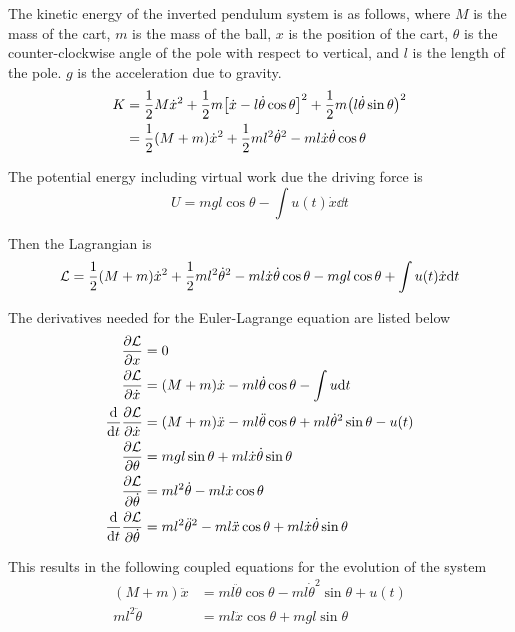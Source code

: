 \documentclass[a4paper,12pt]{article}
\begin{document}
The kinetic energy of the inverted pendulum system is as follows, where $M$ is
the mass of the cart, $m$ is the mass of the ball, $x$ is the position of the
cart, $\theta$ is the counter-clockwise angle of the pole with respect to
vertical, and $l$ is the length of the pole. $g$ is the acceleration due to
gravity.
\begin{align}
    K &= \frac{1}{2} M \dot{x}^2 \nonumber
      + \frac{1}{2} m \qty[ \dot{x} - l \dot{\theta} \cos \theta]^2
      + \frac{1}{2} m \qty(l \dot{\theta} \sin \theta)^2 \\
      &= \frac{1}{2} \qty(M+m) \dot{x}^2 + \frac{1}{2} m l^2 \dot{\theta}^2
      - ml \dot{x} \dot{\theta} \cos \theta
\end{align}

The potential energy including virtual work due the driving force is
\begin{equation}
    U = mgl \cos \theta - \int u(t) \dot{x} \dd t
\end{equation}

Then the Lagrangian is
\begin{equation}
    \mathcal{L}
        = \frac{1}{2} \qty(M+m) \dot{x}^2
        + \frac{1}{2} m l^2 \dot{\theta}^2
        - ml \dot{x} \dot{\theta} \cos \theta
        - mgl \cos \theta + \int u(t) \dot{x} \dd t
\end{equation}

The derivatives needed for the Euler-Lagrange equation are listed below
\begin{align*}
    \pdv{\mathcal{L}}{x} &= 0 \\
    \pdv{\mathcal{L}}{\dot{x}} &= (M+m)\dot{x} - ml \dot{\theta} \cos \theta
        - \int u \dd t \\
    \dv{t}\pdv{\mathcal{L}}{\dot{x}} &=
        (M+m) \ddot{x}
        - ml \ddot{\theta} \cos \theta
        + ml \dot{\theta}^2 \sin\theta
        - u(t) \\
    \pdv{\mathcal{L}}{\theta} &=
        mgl \sin\theta
        + ml\dot{x} \dot{\theta} \sin\theta \\
    \pdv{\mathcal{L}}{\dot{\theta}} &=
        ml^2 \dot{\theta} - ml \dot{x} \cos \theta \\
    \dv{t} \pdv{\mathcal{L}}{\dot{\theta}} &=
        ml^2 \ddot{\theta}^2
        - ml \ddot{x} \cos \theta
        + ml \dot{x}\dot{\theta} \sin \theta
\end{align*}

This results in the following coupled equations for the evolution of the system
\begin{align}
    (M+m) \ddot{x} &= ml \ddot{\theta} \cos \theta
        - ml \dot{\theta}^2 \sin\theta + u(t) \\
    ml^2 \ddot{\theta} &= ml \ddot{x} \cos \theta + mgl\sin\theta
\end{align}
\end{document}
